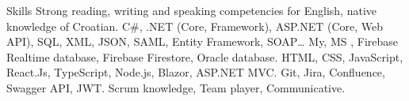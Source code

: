 
\begin{rubric}{Skills}
	\entry*[Languages]
	Strong reading, writing and speaking competencies for English, native knowledge of Croatian.
	C\#, .NET (Core, Framework), ASP.NET (Core, Web API), SQL, XML, JSON, SAML, Entity Framework, SOAP\ldots
	\entry*[Databases]
	My, MS  , Firebase Realtime database, Firebase Firestore, Oracle database.
	HTML, CSS, JavaScript, React.Js, TypeScript, Node.js, Blazor, ASP.NET MVC.
	\entry*[Tools.]
	Git, Jira, Confluence, Swagger API, JWT.
	\entry*[Misc.]
	Scrum knowledge, Team player, Communicative.
\end{rubric}
